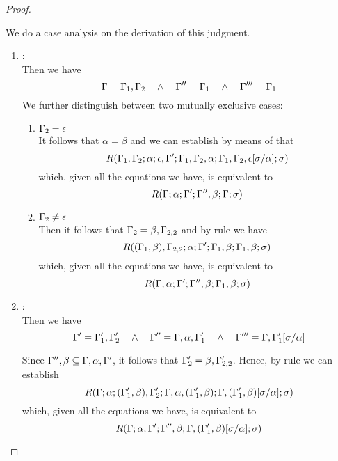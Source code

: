 \begin{proof}
\begin{description}
  We do a case analysis on the derivation of this judgment.
  \begin{enumerate}
  \item {}: \\ Then we have
\begin{equation*}
  \Gamma = \Gamma_1,\Gamma_2 \quad\wedge\quad \Gamma'' = \Gamma_1 \quad\wedge\quad \Gamma''' = \Gamma_1
\end{equation*}
  We further distinguish between two mutually exclusive cases:
  \begin{enumerate}
  \item $\Gamma_2 = \epsilon$ \\
        It follows that $\alpha = \beta$ and we can establish by means of  that
\begin{equation*}
R(\Gamma_1,\Gamma_2;\alpha;\epsilon,\Gamma';\Gamma_1,\Gamma_2,\alpha;\Gamma_1,\Gamma_2,\epsilon[\sigma/\alpha];\sigma)
\end{equation*}
        which, given all the equations we have, is equivalent to
\begin{equation*}
R(\Gamma;\alpha;\Gamma';\Gamma'',\beta;\Gamma;\sigma)
\end{equation*}

  \item $\Gamma_2 \neq \epsilon$ \\
       Then it follows that $\Gamma_2 = \beta,\Gamma_{2,2}$ and by rule  we have
\begin{equation*}
R((\Gamma_1,\beta),\Gamma_{2,2};\alpha;\Gamma';\Gamma_1,\beta;\Gamma_1,\beta;\sigma)
\end{equation*}
        which, given all the equations we have, is equivalent to
\begin{equation*}
R(\Gamma;\alpha;\Gamma';\Gamma'',\beta;\Gamma_1,\beta;\sigma)
\end{equation*}
  \end{enumerate}

  \item {}: \\
   Then we have
\begin{equation*}
  \Gamma' = \Gamma_1',\Gamma_2' \quad\wedge\quad \Gamma'' = \Gamma,\alpha,\Gamma_1' \quad\wedge\quad
      \Gamma''' = \Gamma,\Gamma_1'[\sigma/\alpha]
\end{equation*}

  Since $\Gamma'',\beta \subseteq \Gamma,\alpha,\Gamma'$, it follows that $\Gamma_2' = \beta,\Gamma_{2,2}'$.
  Hence, by rule  we can establish
\begin{equation*}
R(\Gamma;\alpha;(\Gamma_1',\beta),\Gamma_2';\Gamma,\alpha,(\Gamma_1',\beta);\Gamma,(\Gamma_1',\beta)[\sigma/\alpha];\sigma)
\end{equation*}
        which, given all the equations we have, is equivalent to
\begin{equation*}
R(\Gamma;\alpha;\Gamma';\Gamma'',\beta;\Gamma,(\Gamma_1',\beta)[\sigma/\alpha];\sigma)
\end{equation*}
  \end{enumerate}
\end{description}
\end{proof}

